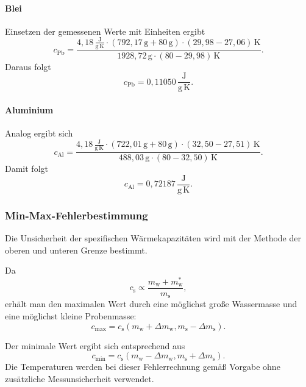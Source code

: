 \documentclass{report}
\begin{document}
\paragraph{Blei}
\noindent
Einsetzen der gemessenen Werte mit Einheiten ergibt
\[
c_\mathrm{Pb}
=
\frac{
4{,}18\,\frac{\mathrm{J}}{\mathrm{g\,K}}
\cdot
(792{,}17\,\mathrm{g}+80\,\mathrm{g})
\cdot
(29{,}98-27{,}06)\,\mathrm{K}
}{
1928{,}72\,\mathrm{g}
\cdot
(80-29{,}98)\,\mathrm{K}
}.
\]
\noindent
Daraus folgt
\[
c_\mathrm{Pb}
=
0{,}11050\,\frac{\mathrm{J}}{\mathrm{g\,K}}.
\]


\paragraph{Aluminium}
\noindent
Analog ergibt sich
\[
c_\mathrm{Al}
=
\frac{
4{,}18\,\frac{\mathrm{J}}{\mathrm{g\,K}}
\cdot
(722{,}01\,\mathrm{g}+80\,\mathrm{g})
\cdot
(32{,}50-27{,}51)\,\mathrm{K}
}{
488{,}03\,\mathrm{g}
\cdot
(80-32{,}50)\,\mathrm{K}
}.
\]
\noindent
Damit folgt
\[
c_\mathrm{Al}
=
0{,}72187\,\frac{\mathrm{J}}{\mathrm{g\,K}}.
\]


\subsubsection{Min-Max-Fehlerbestimmung}
\noindent
Die Unsicherheit der spezifischen Wärmekapazitäten wird mit der Methode der
oberen und unteren Grenze bestimmt.

Da
\[
c_\mathrm{s}
\propto
\frac{m_\mathrm{w}+m_\mathrm{w}^{*}}{m_\mathrm{s}},
\]
\noindent
erhält man den maximalen Wert durch eine möglichst große Wassermasse und
eine möglichst kleine Probenmasse:
\[
c_{\mathrm{max}}
=
c_\mathrm{s}
(m_\mathrm{w}+\Delta m_\mathrm{w},
m_\mathrm{s}-\Delta m_\mathrm{s}).
\]

Der minimale Wert ergibt sich entsprechend aus
\[
c_{\mathrm{min}}
=
c_\mathrm{s}
(m_\mathrm{w}-\Delta m_\mathrm{w},
m_\mathrm{s}+\Delta m_\mathrm{s}).
\]
\noindent
Die Temperaturen werden bei dieser Fehlerrechnung gemäß Vorgabe ohne
zusätzliche Messunsicherheit verwendet.
\end{document}
